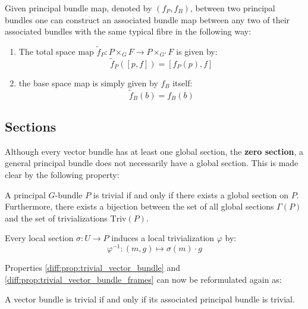 	\begin{construct}
		Given principal bundle map, denoted by $(f_P, f_B)$, between two principal bundles one can construct an associated bundle map between any two of their associated bundles with the same typical fibre in the following way:
		\begin{enumerate}
			\item The total space map $\widetilde{f}_P:P\times_G F\rightarrow P\times_{G'} F$ is given by:
			\begin{equation}
				\widetilde{f}_P([p, f]) = [f_P(p), f]
			\end{equation}
			\item the base space map is simply given by $f_B$ itself:
			\begin{equation}
				\widetilde{f}_B(b) = f_B(b)
			\end{equation}
		\end{enumerate}
	\end{construct}

\subsection{Sections}

	Although every vector bundle has at least one global section, the \textbf{zero section}\footnotemark, a general principal bundle does not necessarily have a global section. This is made clear by the following property:
	\begin{property}
		A principal $G$-bundle $P$ is trivial if and only if there exists a global section on $P$. Furthermore, there exists a bijection between the set of all global sections $\Gamma(P)$ and the set of trivializations $\text{Triv}(P)$.
	\end{property}
	
	\begin{result}\label{diff:prin_section_triv}
		Every local section $\sigma:U\rightarrow P$ induces a local trivialization $\varphi$ by:
		\begin{equation}
			\varphi^{-1}:(m, g)\mapsto \sigma(m)\cdot g
		\end{equation}
	\end{result}
	
	Properties \ref{diff:prop:trivial_vector_bundle} and \ref{diff:prop:trivial_vector_bundle_frames} can now be reformulated again as:
	\begin{theorem}
		A vector bundle is trivial if and only if its associated principal bundle is trivial.
	\end{theorem}
	
